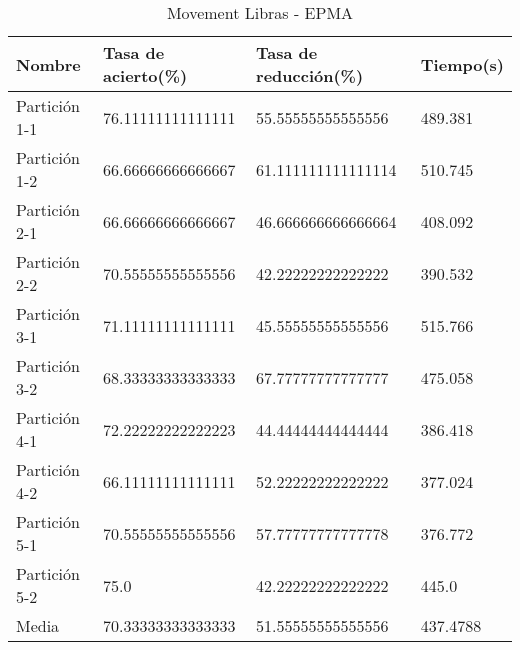 \begin{table}[H]
	\centering
	\begin{tabular}{l|lll}
		Nombre        & Tasa de acierto(\%) & Tasa de reducción(\%) & Tiempo(s) \\ \hline
		Partición 1-1 & 76.11111111111111   & 55.55555555555556     & 489.381   \\
		Partición 1-2 & 66.66666666666667   & 61.111111111111114    & 510.745   \\
		Partición 2-1 & 66.66666666666667   & 46.666666666666664    & 408.092   \\
		Partición 2-2 & 70.55555555555556   & 42.22222222222222     & 390.532   \\
		Partición 3-1 & 71.11111111111111   & 45.55555555555556     & 515.766   \\
		Partición 3-2 & 68.33333333333333   & 67.77777777777777     & 475.058   \\
		Partición 4-1 & 72.22222222222223   & 44.44444444444444     & 386.418   \\
		Partición 4-2 & 66.11111111111111   & 52.22222222222222     & 377.024   \\
		Partición 5-1 & 70.55555555555556   & 57.77777777777778     & 376.772   \\
		Partición 5-2 & 75.0                & 42.22222222222222     & 445.0     \\ \hline
		Media         & 70.33333333333333   & 51.55555555555556     & 437.4788
	\end{tabular}
	\caption{Movement Libras - EPMA}
	\label{MLIB-EPMA}
\end{table}